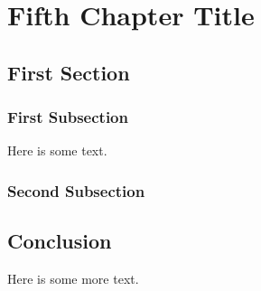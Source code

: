  \chapter{Fifth Chapter Title}


\section{First Section}
\subsection{First Subsection}
Here is some text. 

\subsection{Second Subsection}

\section{Conclusion}
Here is some more text. 